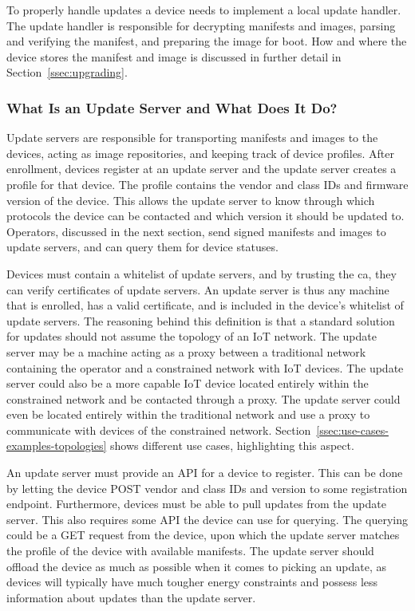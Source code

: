 \documentclass[0-thesis.tex]{subfiles}
\begin{document}
To properly handle updates a device needs to implement a local update handler. The update
handler is responsible for decrypting manifests and images, parsing and verifying the
manifest, and preparing the image for boot. How and where the device stores the manifest
and image is discussed in further detail in Section~\ref{ssec:upgrading}.

\subsubsection{What Is an Update Server and What Does It Do?}
\label{sssec:what-is-an-update-server}
Update servers are responsible for transporting manifests and images to the devices,
acting as image repositories, and keeping track of device profiles. After enrollment,
devices register at an update server and the update server creates a profile for that
device. The profile contains the vendor and class IDs and firmware version of the device.
This allows the update server to know through which protocols the device can be contacted
and which version it should be updated to. Operators, discussed in the next section, send
signed manifests and images to update servers, and can query them for device statuses.

Devices must contain a whitelist of update servers, and by trusting the \gls{ca}, they can
verify certificates of update servers. An update server is thus any machine that is
enrolled, has a valid certificate, and is included in the device's whitelist of update
servers. The reasoning behind this definition is that a standard solution for updates
should not assume the topology of an IoT network. The update server may be a machine
acting as a proxy between a traditional network containing the operator and a constrained
network with IoT devices. The update server could also be a more capable IoT device
located entirely within the constrained network and be contacted through a proxy. The
update server could even be located entirely within the traditional network and use a
proxy to communicate with devices of the constrained network.
Section~\ref{ssec:use-cases-examples-topologies} shows different use cases, highlighting
this aspect.

An update server must provide an API for a device to register. This can be done by letting
the device POST vendor and class IDs and version to some registration endpoint.
Furthermore, devices must be able to pull updates from the update server. This also
requires some API the device can use for querying. The querying could be a GET request
from the device, upon which the update server matches the profile of the device with
available manifests. The update server should offload the device as much as possible when
it comes to picking an update, as devices will typically have much tougher energy
constraints and possess less information about updates than the update server.
\end{document}
